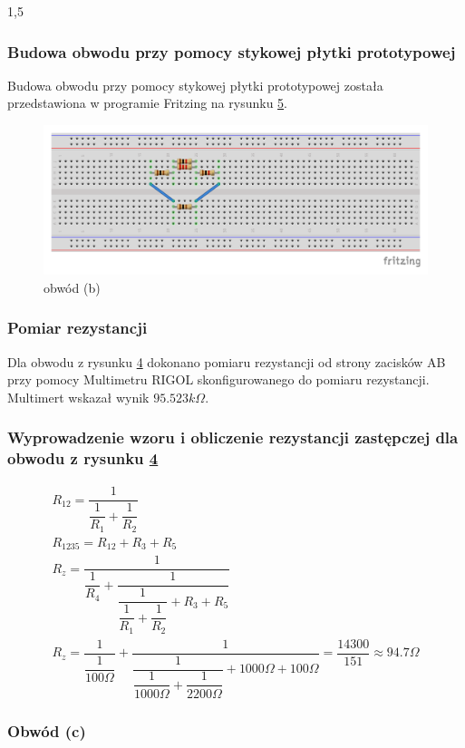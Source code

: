 \documentclass[polish,polish,a4paper]{article}
\begin{document}
\begin{spacing}{1,5}
		\subsubsection*{Budowa obwodu przy pomocy stykowej płytki prototypowej}
		Budowa obwodu przy pomocy stykowej płytki prototypowej została przedstawiona w programie Fritzing na rysunku \hyperref[fig:rys5]{5}.
		\begin{figure}[H]
			\centering
			\includegraphics[scale=0.9]{b_bb.pdf}
			\caption{obwód (b)}
			\label{fig:rys5}
		\end{figure}
		\subsubsection*{Pomiar rezystancji}
		Dla obwodu z rysunku \hyperref[eq:rys4]{4} dokonano pomiaru rezystancji od strony zacisków AB przy pomocy Multimetru RIGOL skonfigurowanego do pomiaru rezystancji. Multimert wskazał wynik $95.523k \Omega$.
		
		\subsubsection*{Wyprowadzenie wzoru i obliczenie rezystancji zastępczej  dla obwodu z rysunku \hyperref[eq:rys4]{4}}
		
		\begin{gather*}
		R_{12}=\dfrac{1}{\dfrac{1}{R_{1}} + \dfrac{1}{R_{2}}} \\
		R_{1235} = R_{12} + R_{3} + R_{5} \\
		R_{z} = \dfrac{1}{\dfrac{1}{R_{4}} +  \dfrac{1}{ \dfrac{1}{\dfrac{1}{R_{1}} + \dfrac{1}{R_{2}}} + R_{3} + R_{5}}}\\
		R_{z} = \dfrac{1}{\dfrac{1}{100\Omega}} +  \dfrac{1}{ \dfrac{1}{\dfrac{1}{1000\Omega} + \dfrac{1}{2200 \Omega}} + 1000\Omega + 100\Omega} = \dfrac{14300}{151} \approx 94.7\Omega
		\end{gather*}
		
		\subsubsection{Obwód (c)}
		

\end{spacing}
\end{document}
